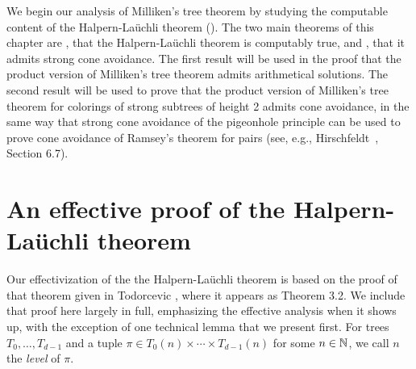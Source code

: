 We begin our analysis of Milliken's tree theorem by studying the computable content of the Halpern-La\"{u}chli theorem (). The two main theorems of this chapter are , that the Halpern-La\"{u}chli theorem is computably true, and , that it admits strong cone avoidance. The first result will be used in the proof that the product version of Milliken's tree theorem admits arithmetical solutions. The second result will be used to prove that the product version of Milliken's tree theorem for colorings of strong subtrees of height 2 admits cone avoidance, in the same way that strong cone avoidance of the pigeonhole principle can be used to prove cone avoidance of Ramsey's theorem for pairs (see, e.g., Hirschfeldt~\cite{Hirschfeldt2015Slicing}, Section 6.7).
\section{An effective proof of the Halpern-La\"{u}chli theorem}

Our effectivization of the the Halpern-La\"{u}chli theorem is based on the proof of that theorem given in Todorcevic \cite{Todorcevic2010Ramsey}, where it appears as Theorem 3.2. We include that proof here largely in full, emphasizing the effective analysis when it shows up, with the exception of one technical lemma that we present first. For trees $T_0,\ldots,T_{d-1}$ and a tuple $\pi \in T_0(n) \times \cdots \times T_{d-1}(n)$ for some $n \in \mathbb{N}$, we call $n$ the \emph{level} of $\pi$.



